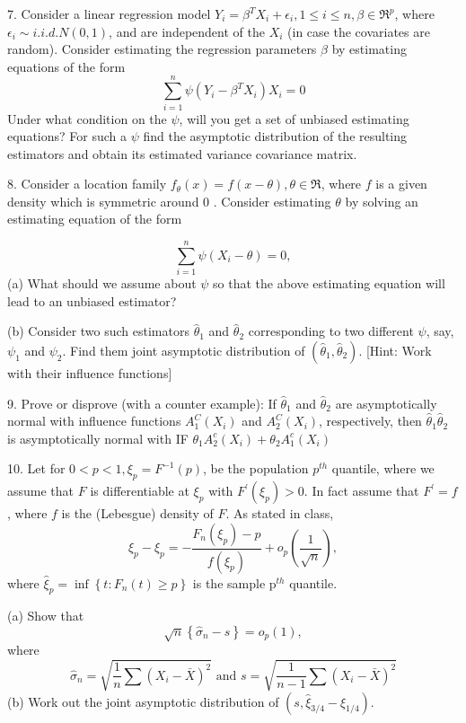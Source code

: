 \documentclass[11pt]{article}
\theoremstyle{definition}
\begin{document}
7. Consider a linear regression model $Y_i=\beta^T X_i+\epsilon_i, 1 \leq i \leq n, \beta \in \Re^p$, where $\epsilon_i \sim i . i . d . N(0,1)$, and are independent of the $X_i$ (in case the covariates are random). Consider estimating the regression parameters $\beta$ by estimating equations of the form
$$
\sum_{i=1}^n \psi\left(Y_i-\beta^T X_i\right) X_i=0
$$
Under what condition on the $\psi$, will you get a set of unbiased estimating equations? For such a $\psi$ find the asymptotic distribution of the resulting estimators and obtain its estimated variance covariance matrix.


8. Consider a location family $f_\theta(x)=f(x-\theta), \theta \in \Re$, where $f$ is a given density which is symmetric around 0 . Consider estimating $\theta$ by solving an estimating equation of the form

$$
\sum_{i=1}^n \psi\left(X_i-\theta\right)=0,
$$
(a) What should we assume about $\psi$ so that the above estimating equation will lead to an unbiased estimator?

(b) Consider two such estimators $\widehat{\theta}_1$ and $\widehat{\theta}_2$ corresponding to two different $\psi$, say, $\psi_1$ and $\psi_2$. Find them joint asymptotic distribution of $\left(\widehat{\theta}_1, \widehat{\theta}_2\right)$.
[Hint: Work with their influence functions]

9. Prove or disprove (with a counter example): If $\hat{\theta}_1$ and $\hat{\theta}_2$ are asymptotically normal with influence functions $A_1^C\left(X_i\right)$ and $A_2^C\left(X_i\right)$, respectively, then $\widehat{\theta}_1 \widehat{\theta}_2$ is asymptotically normal with IF $\theta_1 A_2^c\left(X_i\right)+\theta_2 A_1^c\left(X_i\right)$

10. Let for $0<p<1, \xi_p=F^{-1}(p)$, be the population $p^{t h}$ quantile, where we assume that $F$ is differentiable at $\xi_p$ with $F^{\prime}\left(\xi_p\right)>0$. In fact assume that $F^{\prime}=f$, where $f$ is the (Lebesgue) density of $F$. As stated in class,
$$
\widehat{\xi}_p-\xi_p=-\frac{F_n\left(\xi_p\right)-p}{f\left(\xi_p\right)}+o_p\left(\frac{1}{\sqrt{n}}\right),
$$
where $\widehat{\xi}_p=\inf \left\{t: F_n(t) \geq p\right\}$ is the sample $\mathrm{p}^{t h}$ quantile.

(a) Show that
$$
\sqrt{n}\left\{\widehat{\sigma}_n-s\right\}=o_p(1),
$$
where
$$
\widehat{\sigma}_n=\sqrt{\frac{1}{n} \sum\left(X_i-\bar{X}\right)^2} \text { and } s=\sqrt{\frac{1}{n-1} \sum\left(X_i-\bar{X}\right)^2}
$$
(b) Work out the joint asymptotic distribution of $\left(s, \widehat{\xi}_{3 / 4}-\widehat{\xi}_{1 / 4}\right)$.
\end{document}
